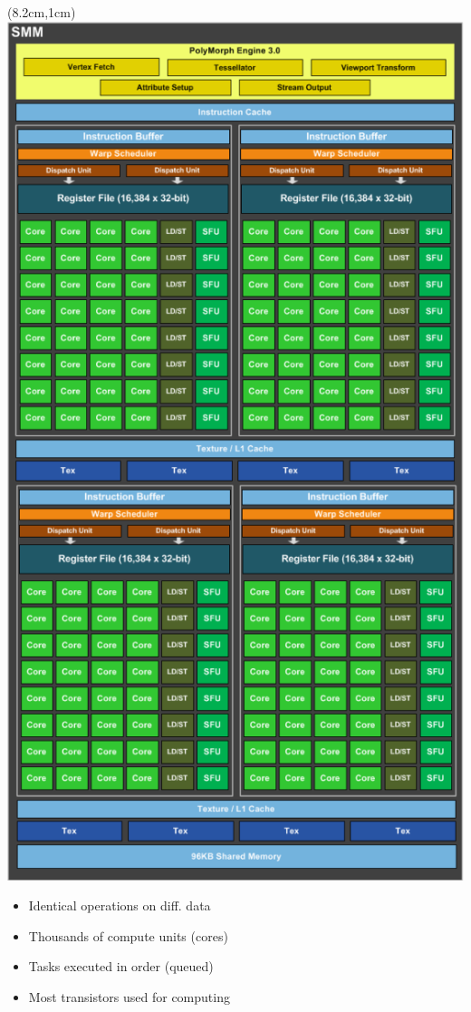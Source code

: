\documentclass{beamer}
\begin{document}
\begin{frame}[fragile]
\begin{textblock*}{4cm}(8.2cm,1cm)
\includegraphics[width=\textwidth]{graphics/gtx980}
\end{textblock*}

\begin{itemize}
\item<2-> Identical operations on diff. data
\item<3-> Thousands of compute units (cores)
\item<4-> Tasks executed in order (queued)
\item<5-> Most transistors used for computing
\end{itemize}

\end{frame}
\end{document}
